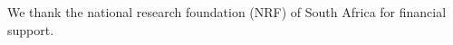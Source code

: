 \begin{acknowledgments}
We thank the national research foundation (NRF) of South Africa for financial support.
\end{acknowledgments}